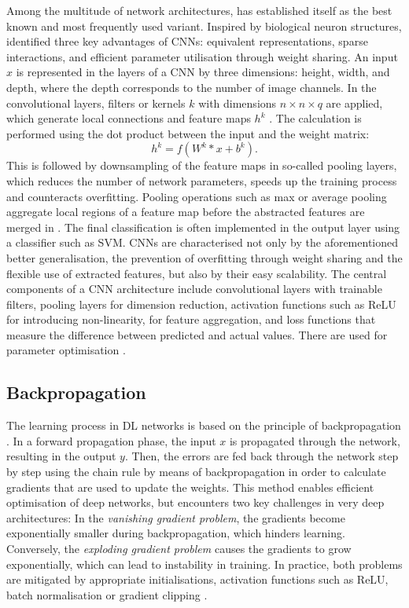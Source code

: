 Among the multitude of network architectures,  has established itself as the best known and most frequently used variant. Inspired by biological neuron structures, \citeauthor{Goodfellow-et-al-2016} identified three key advantages of CNNs: equivalent representations, sparse interactions, and efficient parameter utilisation through weight sharing. An input $x$ is represented in the layers of a CNN by three dimensions: height, width, and depth, where the depth corresponds to the number of image channels. In the convolutional layers, filters or kernels $k$ with dimensions $n \times n \times q$ are applied, which generate local connections and feature maps $h^k$ \cite{Alzubaidi2021}. The calculation is performed using the dot product between the input and the weight matrix:  
\begin {equation}
h^k = f(W^k \ast x + b^k).
\end {equation}
This is followed by downsampling of the feature maps in so-called pooling layers, which reduces the number of network parameters, speeds up the training process and counteracts overfitting. Pooling operations such as max or average pooling aggregate local regions of a feature map before the abstracted features are merged in . The final classification is often implemented in the output layer using a classifier such as \acrfull{SVM}. CNNs are characterised not only by the aforementioned better generalisation, the prevention of overfitting through weight sharing and the flexible use of extracted features, but also by their easy scalability. The central components of a \acrshort{CNN} architecture include convolutional layers with trainable filters, pooling layers for dimension reduction, activation functions such as \acrfull{ReLU} for introducing non-linearity,  for feature aggregation, and loss functions that measure the difference between predicted and actual values. There are used for parameter optimisation \cite{Alzubaidi2021}.

\subsection{Backpropagation}

The learning process in \acrlong{DL} networks is based on the principle of backpropagation \cite{Goodfellow-et-al-2016}. In a forward propagation phase, the input $x$ is propagated through the network, resulting in the output $y$. Then, the errors are fed back through the network step by step using the chain rule by means of backpropagation in order to calculate gradients that are used to update the weights. This method enables efficient optimisation of deep networks, but encounters two key challenges in very deep architectures: In the \textit{vanishing gradient problem}, the gradients become exponentially smaller during backpropagation, which hinders learning. Conversely, the \textit{exploding gradient problem} causes the gradients to grow exponentially, which can lead to instability in training. In practice, both problems are mitigated by appropriate initialisations, activation functions such as \acrshort{ReLU}, batch normalisation or gradient clipping \cite{Alzubaidi2021}.  

